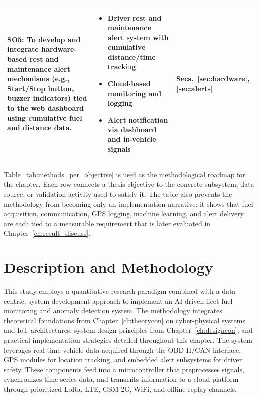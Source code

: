 \begin{center}
\begin{tabularx}{\textwidth}{p{}|X|p{}}
\hline 
SO5: To develop and integrate hardware-based rest and maintenance alert mechanisms (e.g., Start/Stop button, buzzer indicators) tied to the web dashboard using cumulative fuel and distance data. &
\begin{itemize}
    \item Driver rest and maintenance alert system with cumulative distance/time tracking
    \item Cloud-based monitoring and logging
    \item Alert notification via dashboard and in-vehicle signals
\end{itemize} & Secs.~\ref{sec:hardware}, \ref{sec:alerts} \\
\hline
\end{tabularx}
\end{center}

Table~\ref{tab:methods_per_objective} is used as the methodological roadmap for the chapter. Each row connects a thesis objective to the concrete subsystem, data source, or validation activity used to satisfy it. The table also prevents the methodology from becoming only an implementation narrative: it shows that fuel acquisition, communication, GPS logging, machine learning, and alert delivery are each tied to a measurable requirement that is later evaluated in Chapter~\ref{ch:result_discuss}.


\section{Description and Methodology}
\label{sec:method_description}

This study employs a quantitative research paradigm combined with a data-centric, system development approach to implement an AI-driven fleet fuel monitoring and anomaly detection system. The methodology integrates theoretical foundations from Chapter~\ref{ch:theorycon} on cyber-physical systems and IoT architectures, system design principles from Chapter~\ref{ch:designcon}, and practical implementation strategies detailed throughout this chapter. The system leverages real-time vehicle data acquired through the OBD-II/CAN interface, GPS modules for location tracking, and embedded alert subsystems for driver safety. These components feed into a microcontroller that preprocesses signals, synchronizes time-series data, and transmits information to a cloud platform through prioritized LoRa, LTE, GSM 2G, WiFi, and offline-replay channels.

